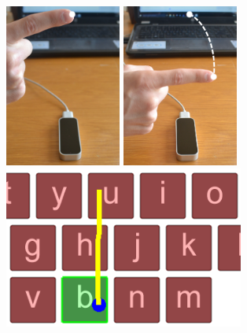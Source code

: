 \begin{figure}[!t]
	\centering
	\begin{minipage}[t]{5in}
		\begin{minipage}[t]{1.5in}
			\begin{minipage}[t]{1.5in}
				\includegraphics[width=1.5in]{Figures/fig_bad_calib_before}
			\end{minipage}
			
			\begin{minipage}[t]{1.5in}
				\includegraphics[width=1.5in]{Figures/fig_bad_calib_after}
			\end{minipage}
		\end{minipage}
		\begin{minipage}[t]{3.5in}
			\begin{minipage}[t]{0.4in}
			\end{minipage}
			\begin{minipage}[t]{3.1in}
				\includegraphics[width=3.1in]{Figures/fig_intended_path}
			\end{minipage}
			

\end{minipage}
\end{minipage}
\end{figure}
